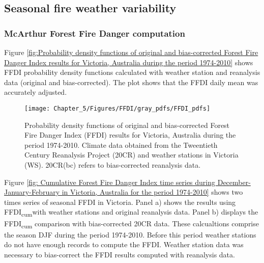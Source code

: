 \subsection{Seasonal fire weather variability}


\subsubsection{McArthur Forest Fire Danger computation}

Figure \ref{fig:Probability density functions of original and bias-corrected Forest Fire Danger Index results for Victoria, Australia during the period 1974-2010}
shows FFDI probability density functions calculated with weather station
and reanalysis data (original and bias-corrected). The plot shows
that the FFDI daily mean was accurately adjusted. 

\begin{figure}[h]
\noindent \begin{centering}
\texttt{[image: Chapter\_5/Figures/FFDI/gray\_pdfs/FFDI\_pdfs]}
\par\end{centering}

\caption[Probability density functions of original and bias-corrected Forest
Fire Danger Index (FFDI) results for Victoria, Australia during the
period 1974-2010]{Probability density functions of original and bias-corrected Forest
Fire Danger Index (FFDI) results for Victoria, Australia during the
period 1974-2010. Climate data obtained from the Tweentieth Century
Reanalysis Project (20CR) and weather stations in Victoria (WS). 20CR(bc)
refers to bias-corrected reanalysis data. \label{fig:Probability density functions of orginal and bias-corrected Forest Fire Danger Index results for Victoria, Australia during the period 1974-2010}}
\end{figure}


Figure \ref{fig: Cumulative Forest Fire Danger Index time series during December-January-February in Victoria, Australia for the period 1974-2010}
shows two times series of seasonal FFDI in Victoria. Panel a) shows
the results using FFDI\textsubscript{cum}with weather stations and
original reanalysis data. Panel b) displays the FFDI\textsubscript{cum}
comparison with bias-corrected 20CR data. These calcualtions comprise
the season DJF during the period 1974-2010. Before this period weather
stations do not have enough records to compute the FFDI. Weather station
data was necessary to bias-correct the FFDI results computed with
reanalysis data. 


